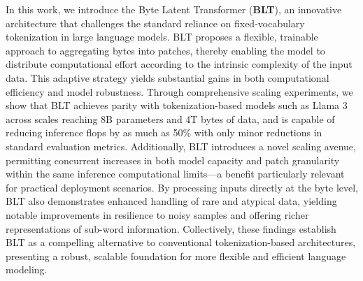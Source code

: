 In this work, we introduce the Byte Latent Transformer (\textbf{BLT}), an innovative architecture that challenges the standard reliance on fixed-vocabulary tokenization in large language models. {\textsc BLT} proposes a flexible, trainable approach to aggregating bytes into patches, thereby enabling the model to distribute computational effort according to the intrinsic complexity of the input data. This adaptive strategy yields substantial gains in both computational efficiency and model robustness. Through comprehensive scaling experiments, we show that {\textsc BLT} achieves parity with tokenization-based models such as Llama 3 across scales reaching 8B parameters and 4T bytes of data, and is capable of reducing inference flops by as much as 50\% with only minor reductions in standard evaluation metrics. Additionally, {\textsc BLT} introduces a novel scaling avenue, permitting concurrent increases in both model capacity and patch granularity within the same inference computational limits—a benefit particularly relevant for practical deployment scenarios. By processing inputs directly at the byte level, {\textsc BLT} also demonstrates enhanced handling of rare and atypical data, yielding notable improvements in resilience to noisy samples and offering richer representations of sub-word information. Collectively, these findings establish {\textsc BLT} as a compelling alternative to conventional tokenization-based architectures, presenting a robust, scalable foundation for more flexible and efficient language modeling.

